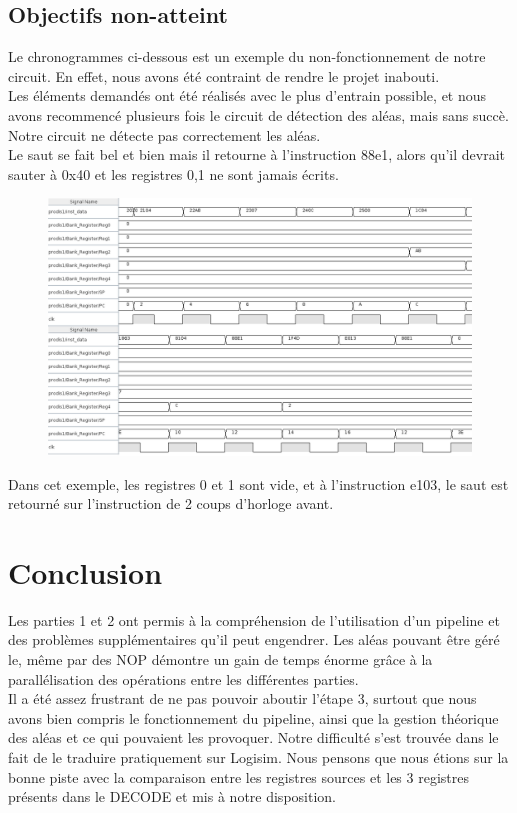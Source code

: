 \documentclass[a4paper]{article} %
\begin{document}
\subsection{Objectifs non-atteint}
Le chronogrammes ci-dessous est un exemple du non-fonctionnement de notre circuit. En effet, nous avons été contraint de rendre le projet inabouti.\\
Les éléments demandés ont été réalisés avec le plus d'entrain possible, et nous avons recommencé plusieurs fois le circuit de détection des aléas, mais sans succè. Notre circuit ne détecte pas correctement les aléas.\\
Le saut se fait bel et bien mais il retourne à l'instruction 88e1, alors qu'il devrait sauter à 0x40 et les registres 0,1 ne sont jamais écrits.\\
\begin{figure}[H]
   \centering
   \includegraphics[width=.8\textwidth]{src/CHRONO_ET3.png}
\end{figure}
Dans cet exemple, les registres 0 et 1 sont vide, et à l'instruction e103, le saut est retourné sur l'instruction de 2 coups d'horloge avant.

\section{Conclusion}
Les parties 1 et 2 ont permis à la compréhension de l'utilisation d'un pipeline et des problèmes supplémentaires qu'il peut engendrer. Les aléas pouvant être géré le, même par des NOP démontre un gain de temps énorme grâce à la parallélisation des opérations entre les différentes parties.\\
Il a été assez frustrant de ne pas pouvoir aboutir l'étape 3, surtout que nous avons bien compris le fonctionnement du pipeline, ainsi que la gestion théorique des aléas et ce qui pouvaient les provoquer. Notre difficulté s'est trouvée dans le fait de le traduire pratiquement sur Logisim. Nous pensons que nous étions sur la bonne piste avec la comparaison entre les registres sources et les 3 registres présents dans le DECODE et mis à notre disposition.
\end{document}
